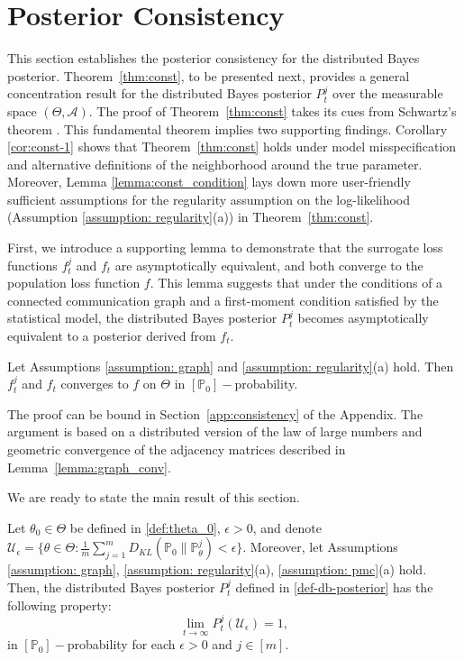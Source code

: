 \documentclass[twoside,11pt]{article}
\numberwithin{equation}{section}
\newcommand{\U}{\mathcal{U}}
\newcommand\bP{\mathbb{P}}
\begin{document}
{%

\section{Posterior Consistency}
\label{sect: consistency}


This section establishes the posterior consistency for the distributed Bayes posterior.  Theorem~\ref{thm:const}, to be presented next, provides a general concentration result for the distributed Bayes posterior $P_t^j$ over the measurable space $(\Theta, \mathcal{A})$. The proof of Theorem~\ref{thm:const} takes its cues from Schwartz's theorem \citep{Schwartz1965}. This fundamental theorem implies two supporting findings. {Corollary \ref{cor:const-1} shows that Theorem~\ref{thm:const} holds under model misspecification and alternative definitions of the neighborhood around the true parameter}. Moreover, Lemma \ref{lemma:const_condition} lays down more user-friendly sufficient assumptions for the regularity assumption on the log-likelihood (Assumption \ref{assumption: regularity}(a)) in Theorem~\ref{thm:const}.


{First, we introduce a supporting lemma to demonstrate that the surrogate loss functions $f_t^j$ and $f_t$ are asymptotically equivalent, and both converge to the population loss function $f$. This lemma suggests that under the conditions of a connected communication graph and a first-moment condition satisfied by the statistical model, the distributed Bayes posterior $P_t^j$ becomes asymptotically equivalent to a posterior derived from $f_t$.}



\begin{lemma}
\label{lemma:ptwise_conv}
Let Assumptions \ref{assumption: graph} and \ref{assumption: regularity}(a) hold. Then $f_t^j$ and $f_t$ converges to $f$ on $\Theta$ in $[\bP_0]-$probability. 
\end{lemma}
The proof can be bound in Section~\ref{app:consistency} of the Appendix. The argument is based on a distributed version of the law of large numbers and geometric convergence of the adjacency matrices described in Lemma~\ref{lemma:graph_conv}. 

We are ready to state the main result of this section. 
\begin{theorem}[Consistency]
\label{thm:const}
Let $\theta_0 \in \Theta$ be defined in \eqref{def:theta_0}, $\epsilon>0$, and denote $\U_\epsilon = \{\theta \in \Theta: \frac{1}{m}\sum_{j = 1}^m D_{KL}(\bP_0 \parallel \bP_\theta^j)<  \epsilon\}$. Moreover, let Assumptions \ref{assumption: graph}, \ref{assumption: regularity}(a), \ref{assumption: pmc}(a) hold.  Then, the distributed Bayes posterior $P_t^j$ defined in \eqref{def-db-posterior} has the following property:
\begin{equation*}
    \lim_{t \to \infty} P_t^j (\U_\epsilon) = 1, 
\end{equation*}
in $[\bP_0]-$probability for each $\epsilon > 0$ and $j \in [m]$. 
\end{theorem}


}
\end{document}

